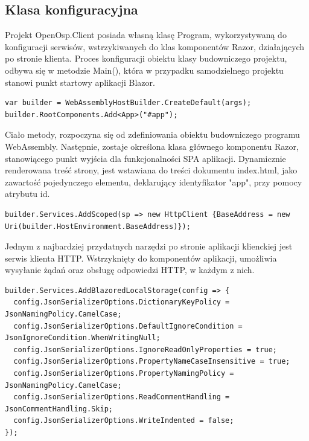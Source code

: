 \subsection{Klasa konfiguracyjna}

Projekt OpenOsp.Client posiada własną klasę Program, wykorzystywaną do konfiguracji serwisów, wstrzykiwanych do klas komponentów Razor, działających po stronie klienta. Proces konfiguracji obiektu klasy budowniczego projektu, odbywa się w metodzie Main(), która w przypadku samodzielnego projektu stanowi punkt startowy aplikacji Blazor.

\begin{lstlisting}[language=CSharp, caption={Konfiguracja głównego komponentu Razor w aplikacji klienckiej}, label=lst:blazor_root]
var builder = WebAssemblyHostBuilder.CreateDefault(args);
builder.RootComponents.Add<App>("#app");
\end{lstlisting}

Ciało metody, rozpoczyna się od zdefiniowania obiektu budowniczego programu WebAssembly. Następnie, zostaje określona klasa głównego komponentu Razor, stanowiącego punkt wyjścia dla funkcjonalności SPA aplikacji. Dynamicznie renderowana treść strony, jest wstawiana do treści dokumentu index.html, jako zawartość pojedynczego elementu, deklarujący identyfikator "app", przy pomocy atrybutu id.

\begin{lstlisting}[language=CSharp, caption={Rejestracja serwisu klienta HTTP w aplikacji klienckiej}, label=lst:blazor_http]
builder.Services.AddScoped(sp => new HttpClient {BaseAddress = new Uri(builder.HostEnvironment.BaseAddress)});
\end{lstlisting}

Jednym z najbardziej przydatnych narzędzi po stronie aplikacji klienckiej jest serwis klienta HTTP. Wstrzyknięty do komponentów aplikacji, umożliwia wysyłanie żądań oraz obsługę odpowiedzi HTTP, w każdym z nich.

\begin{lstlisting}[language=CSharp, caption={Rejestracja serwisu pamięci lokalnej w aplikacji klienckiej}, label=lst:blazor_localStorage]
builder.Services.AddBlazoredLocalStorage(config => {
  config.JsonSerializerOptions.DictionaryKeyPolicy = JsonNamingPolicy.CamelCase;
  config.JsonSerializerOptions.DefaultIgnoreCondition = JsonIgnoreCondition.WhenWritingNull;
  config.JsonSerializerOptions.IgnoreReadOnlyProperties = true;
  config.JsonSerializerOptions.PropertyNameCaseInsensitive = true;
  config.JsonSerializerOptions.PropertyNamingPolicy = JsonNamingPolicy.CamelCase;
  config.JsonSerializerOptions.ReadCommentHandling = JsonCommentHandling.Skip;
  config.JsonSerializerOptions.WriteIndented = false;
});
\end{lstlisting}

